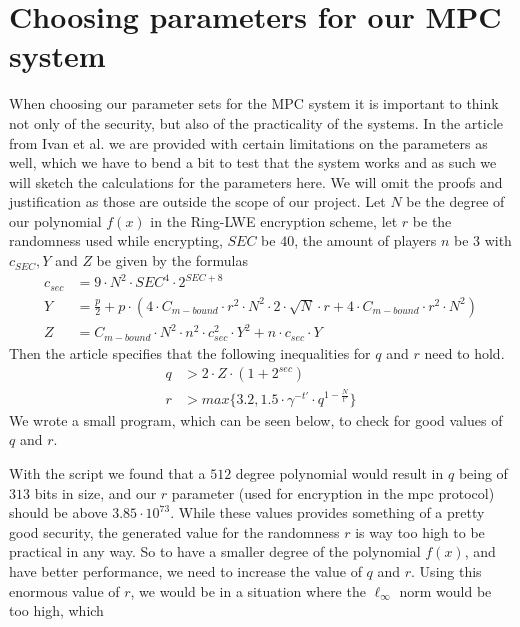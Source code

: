 \documentclass[../main.tex]{subfiles}
\begin{document}
\section{Choosing parameters for our MPC system} \label{sec:choosing-parameters}
    When choosing our parameter sets for the MPC system it is important to think not only of the security, but also of
    the practicality of the systems.
    In the article \cite{damgaard2012multiparty} from Ivan et al. we are provided with certain limitations on the parameters as well, which we have to bend a bit to test that the system works and as such we will sketch the calculations for the parameters here.
    We will omit the proofs and justification as those are outside the scope of our project.
    Let $N$ be the degree of our polynomial $f(x)$ in the Ring-LWE encryption scheme, %
    let $r$ be the randomness used while encrypting, $SEC$ be $40$, the amount of players $n$ be 3 with $c_{SEC}, Y$ and $Z$
    be given by the formulas
    \begin{align*}
        c_{sec} &= 9 \cdot N^2 \cdot SEC^4 \cdot 2^{SEC + 8} \\
        Y       &= \frac{p}{2} + p \cdot (4 \cdot C_{m-bound} \cdot r^2 \cdot N^2 \cdot 2 \cdot \sqrt{N} \cdot r + 4 \cdot C_{m-bound} \cdot r^2 \cdot N^2) \\
        Z       &= C_{m-bound} \cdot N^2 \cdot n^2 \cdot c_{sec}^2 \cdot Y^2 + n \cdot c_{sec} \cdot Y
    \end{align*}
    Then the article specifies that the following inequalities for $q$ and $r$ need to hold.
    \begin{align*}
        q   &> 2 \cdot Z \cdot (1 + 2^{sec}) \\
        r   &> max\{3.2, 1.5 \cdot \gamma^{-t'} \cdot q^{1 - \frac{N}{t'}}\}
    \end{align*}
    We wrote a small program, which can be seen below, to check for good values of $q$ and $r$.
    
	With the script we found that a $512$ degree polynomial would result in $q$ being of $313$ bits in size, and our $r$ parameter (used for encryption in the mpc protocol) should be above $3.85 \cdot 10^{73}$.
	While these values provides something of a pretty good security, the generated value for the randomness $r$ is way too high to be
	practical in any way.
	So to have a smaller degree of the polynomial $f(x)$, and have better performance,
	we need to increase the value of $q$ and $r$.
	Using this enormous value of $r$, we would be in a situation where the $\ell_\infty$ norm would be too high, which
\end{document}
